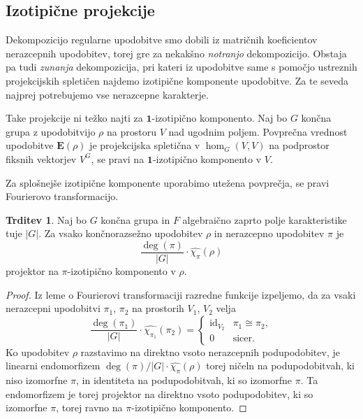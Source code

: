 \documentclass[11pt]{book}
\def\11{\mathbf{1}}
\def\EE{\mathbf{E}}
\DeclareMathOperator\id{id}
\theoremstyle{definition}
\theoremstyle{zgled}
\theoremstyle{odprtproblem}
\theoremstyle{domacanaloga}
\newenvironment{dokaz}
    {\color{siva}\begin{proof}}
    {\end{proof}}
\theoremstyle{izrek}
\newtheorem*{trditev}{Trditev}
\begin{document}
\subsection{Izotipične projekcije}

Dekompozicijo regularne upodobitve smo dobili iz matričnih koeficientov nerazcepnih upodobitev, torej gre za nekakšno \emph{notranjo} dekompozicijo. Obstaja pa tudi \emph{zunanja} dekompozicija, pri kateri iz upodobitve same s pomočjo ustreznih projekcijskih spletičen najdemo izotipične komponente upodobitve. Za te seveda najprej potrebujemo vse nerazcepne karakterje.

Take projekcije ni težko najti za $\11$-izotipično komponento. Naj bo $G$ končna grupa z upodobitvijo $\rho$ na prostoru $V$ nad ugodnim poljem. Povprečna vrednost upodobitve $\EE(\rho)$ je projekcijska spletična v $\hom_G(V,V)$ na podprostor fiksnih vektorjev $V^G$, se pravi na $\11$-izotipično komponento v $V$. 

Za splošnejše izotipične komponente uporabimo utežena povprečja, se pravi Fourierovo transformacijo.
    
\begin{trditev}
Naj bo $G$ končna grupa in $F$ algebraično zaprto polje karakteristike tuje $|G|$. Za vsako končnorazsežno upodobitev $\rho$ in nerazcepno upodobitev $\pi$ je
\[
    \frac{\deg(\pi)}{|G|} \cdot \widehat{\chi_{\pi}}(\rho)
\]
projektor na $\pi$-izotipično komponento v $\rho$.
\end{trditev}
\begin{dokaz}
Iz leme o Fourierovi transformaciji razredne funkcije izpeljemo, da za vsaki nerazcepni upodobitvi $\pi_1$, $\pi_2$ na prostorih $V_1$, $V_2$ velja
\[
    \frac{\deg(\pi_1)}{|G|} \cdot \widehat{\chi_{\pi_1}}(\pi_2) = \begin{cases}
        {\textstyle \id_{V_2}} & \pi_1 \cong \pi_2, \\
        0 & \text{sicer.}
    \end{cases}
\]
Ko upodobitev $\rho$ razstavimo na direktno vsoto nerazcepnih podupodobitev, je linearni endomorfizem $\deg(\pi)/|G| \cdot \widehat{\chi_{\pi}}(\rho)$ torej ničeln na podupodobitvah, ki niso izomorfne $\pi$, in identiteta na podupodobitvah, ki so izomorfne $\pi$. Ta endomorfizem je torej projektor na direktno vsoto podupodobitev, ki so izomorfne $\pi$, torej ravno na $\pi$-izotipično komponento.
\end{dokaz}
\end{document}

